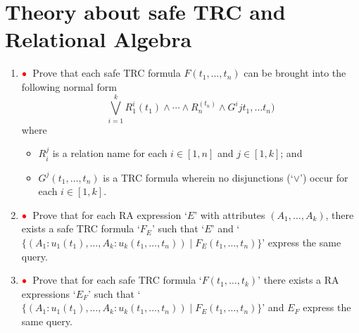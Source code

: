 \documentclass[11pt]{article}
\newcommand{\red}[1]{{\color{red}#1}}
\newcommand{\redbullet}{$\red{\bullet}$}
\begin{document}
\newpage

\section{Theory about safe TRC and Relational Algebra}

\begin{enumerate}[resume]
\item \redbullet\  Prove that each safe TRC formula $F(t_1,\ldots,t_n)$ can be
brought into the following normal form
\[
\bigvee_{i=1}^k R_1^i(t_1)\land\cdots\land R_n^(t_n)\land G^ijt_1,\ldots t_n)
\]
where 
\begin{itemize}
\item $R_i^j$ is a relation name for each $i\in[1,n]$ and $j\in[1,k]$; and
\item $G^j(t_1,\ldots,t_n)$ is a TRC formula wherein no disjunctions (`$\lor$') occur for each $i\in[1,k]$.
\end{itemize}
\item \redbullet\ 
Prove that for each RA expression `$E$' with attributes $(A_1,\ldots,A_k)$, there exists a safe TRC formula `$F_E$' such that `$E$' and 
`$\{(A_1:u_1(t_1),\ldots, A_k:u_k(t_1,\ldots,t_n))\mid F_E(t_1,\ldots,t_n)\}$' 
express the same query.

\item \redbullet\ 
Prove that for each safe TRC formula `$F(t_1,\ldots,t_k)$' there exists a RA expressions `$E_F$' such that 
`$\{(A_1:u_1(t_1),\ldots, A_k:u_k(t_1,\ldots,t_n))\mid F_E(t_1,\ldots,t_n)\}$' 
and $E_F$ express the same query.

\end{enumerate}
\end{document}

